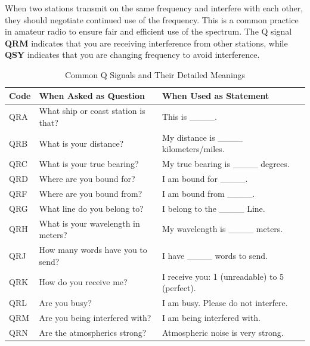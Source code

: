 When two stations transmit on the same frequency and interfere with each other, they should negotiate continued use of the frequency. This is a common practice in amateur radio to ensure fair and efficient use of the spectrum. The Q signal \textbf{QRM} indicates that you are receiving interference from other stations, while \textbf{QSY} indicates that you are changing frequency to avoid interference.


\begin{table}[h!]
    \centering
    \caption{Common Q Signals and Their Detailed Meanings}
    \begin{tabular}{|l|p{5.5cm}|p{5.5cm}|}
        \hline
        \textbf{Code} & \textbf{When Asked as Question} & \textbf{When Used as Statement} \\
        \hline
        QRA & What ship or coast station is that? & This is \_\_\_\_. \\
        \hline
        QRB & What is your distance? & My distance is \_\_\_\_ kilometers/miles. \\
        \hline
        QRC & What is your true bearing? & My true bearing is \_\_\_\_ degrees. \\
        \hline
        QRD & Where are you bound for? & I am bound for \_\_\_\_. \\
        \hline
        QRF & Where are you bound from? & I am bound from \_\_\_\_. \\
        \hline
        QRG & What line do you belong to? & I belong to the \_\_\_\_ Line. \\
        \hline
        QRH & What is your wavelength in meters? & My wavelength is \_\_\_\_ meters. \\
        \hline
        QRJ & How many words have you to send? & I have \_\_\_\_ words to send. \\
        \hline
        QRK & How do you receive me? & I receive you: 1 (unreadable) to 5 (perfect). \\
        \hline
        QRL & Are you busy? & I am busy. Please do not interfere. \\
        \hline
        QRM & Are you being interfered with? & I am being interfered with. \\
        \hline
        QRN & Are the atmospherics strong? & Atmospheric noise is very strong. \\
        \hline
    \end{tabular}
    \label{tab:q_signals}
\end{table}

